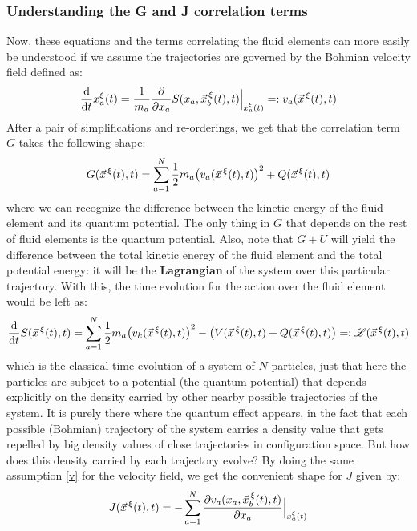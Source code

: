 \documentclass[11pt, a4paper]{article} %
\newcommand{\Lg}{\mathscr{L}}
\begin{document}
\subsubsection*{Understanding the G and J correlation terms}
Now, these equations and the terms correlating the fluid elements can more easily be understood if we assume the trajectories are governed by the Bohmian velocity field defined as:
\begin{equation}\label{v}
\dv{}{t}x_a^\xi(t)=\frac{1}{m_a}\pdv{}{x_a}S(x_a, \vec{x}_b^{\, \xi}(t),t)\Big\rvert_{x^\xi_a(t)}=:v_a(\vec{x}^{\, \xi}(t),t)
\end{equation}
After a pair of simplifications and re-orderings, we get that the correlation term $G$ takes the following shape:
\begin{equation}
G(\vec{x}^{\, \xi}(t),t)=\sum_{a=1}^N \frac{1}{2}m_a\qty(v_a(\vec{x}^{\, \xi}(t),t))^2+Q(\vec{x}^{\, \xi}(t),t)
\end{equation}
where we can recognize the difference between the kinetic energy of the fluid element and its quantum potential. The only thing in $G$ that depends on the rest of fluid elements is the quantum potential. Also, note that $G+U$ will yield the difference between the total kinetic energy of the fluid element and the total potential energy: it will be the {\bf Lagrangian} of the system over this particular trajectory. With this, the time evolution for the action over the fluid element would be left as:
\begin{equation}\label{HJE.L.Bohm}
\dv{}{t}S(\vec{x}^{\, \xi}(t),t)=  \sum_{a=1}^N \frac{1}{2} m_a \qty(v_k(\vec{x}^{\, \xi}(t),t) )^2 - \qty(V(\vec{x}^{\, \xi}(t),t)+ Q(\vec{x}^{\, \xi}(t),t))=: \Lg(\vec{x}^{\, \xi}(t),t)
\end{equation}
which is the classical time evolution of a system of $N$ particles, just that  here the particles are subject to a potential (the quantum potential) that depends explicitly on the density carried by other nearby possible trajectories of the system. It is purely there where the quantum effect appears, in the fact that each possible (Bohmian) trajectory of the system carries a density value that gets repelled by big density values of close trajectories in configuration space. But how does this density carried by each trajectory evolve? By doing the same assumption \eqref{v} for the velocity field, we get the convenient shape for $J$ given by:
\begin{equation}
J(\vec{x}^{\, \xi}(t),t)=-\sum_{a=1}^N \pdv{v_a(x_a, \vec{x}_b^{\, \xi}(t),t)}{x_a}\Big\rvert_{x_a^\xi(t)}
\end{equation}
\end{document}
